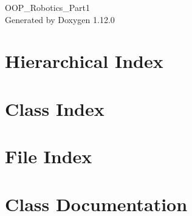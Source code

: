 \documentclass[twoside]{book}
\newcommand{\+}{\discretionary{\mbox{\scriptsize$\hookleftarrow$}}{}{}}
\newcommand{\clearemptydoublepage}{%
    \newpage{\pagestyle{empty}\cleardoublepage}%
  }
\begin{document}
  \raggedbottom
    \hypersetup{pageanchor=false,
                bookmarksnumbered=true,
                pdfencoding=unicode
               }
  \begin{titlepage}
  \vspace*{7cm}
  \begin{center}%
  {\Large OOP\+\_\+\+Robotics\+\_\+\+Part1}\\
  \vspace*{1cm}
  {\large Generated by Doxygen 1.12.0}\\
  \end{center}
  \end{titlepage}
  \clearemptydoublepage
  \tableofcontents
  \clearemptydoublepage
  \hypersetup{pageanchor=true}
\chapter{Hierarchical Index}

\chapter{Class Index}

\chapter{File Index}

\chapter{Class Documentation}





































\end{document}
